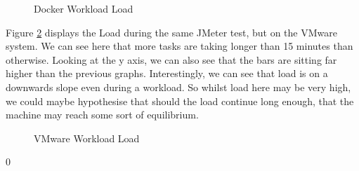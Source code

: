 \begin{figure}[H]
\caption{Docker Workload Load}
\label{fig:Dockerloadwork}
\centering
\end{figure}

Figure \ref{fig:VMwareloadwork} displays the Load during the same JMeter test, but on the VMware system. We can see here that more tasks are taking longer than 15 minutes than otherwise. Looking at the y axis, we can also see that the bars are sitting far higher than the previous graphs. Interestingly, we can see that load is on a downwards slope even during a workload. So whilst load here may be very high, we could maybe hypothesise that should the load continue long enough, that the machine may reach some sort of equilibrium.

\begin{figure}[H]
\caption{VMware Workload Load}
\label{fig:VMwareloadwork}
\centering
\end{figure}
0